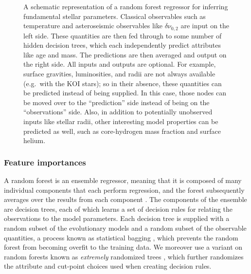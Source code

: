 \documentclass[iop,apj,twocolappendix]{emulateapj}
\begin{document}
\begin{figure}
    \centering
    
    \caption{A schematic representation of a random forest regressor for inferring fundamental stellar parameters. Classical observables such as temperature and asteroseismic observables like $\delta\nu_{0,2}$ are input on the left side. These quantities are then fed through to some number of hidden decision trees, which each independently predict attributes like age and mass. The predictions are then averaged and output on the right side. %
    All inputs and outputs are optional. For example, surface gravities, luminosities, and radii are not always available (e.g.\ with the KOI stars); so in their absence, these quantities can be predicted instead of being supplied. In this case, those nodes can be moved over to the ``prediction'' side instead of being on the ``observations'' side. Also, in addition to potentially unobserved inputs like stellar radii, other interesting model properties can be predicted as well, such as core-hydrogen mass fraction and surface helium. }
    \label{fig:rf}
\end{figure}


\subsubsection{Feature importances}
\label{sec:importances}
A random forest is an ensemble regressor, meaning that it is composed of many individual components that each perform regression, and the forest subsequently averages over the results from each component \citep{breiman2001random}. The components of the ensemble are decision trees, each of which learns a set of decision rules for relating the observations to the model parameters. Each decision tree is supplied with a random subset of the evolutionary models and a random subset of the observable quantities, a process known as statistical bagging \citep[see section 8.7 of][]{hastie2005elements}, which prevents the random forest from becoming overfit to the training data. We moreover use a variant on random forests known as \emph{extremely} randomized trees \citep{geurts2006extremely}, which further randomizes the attribute and cut-point choices used when creating decision rules. 
\end{document}
